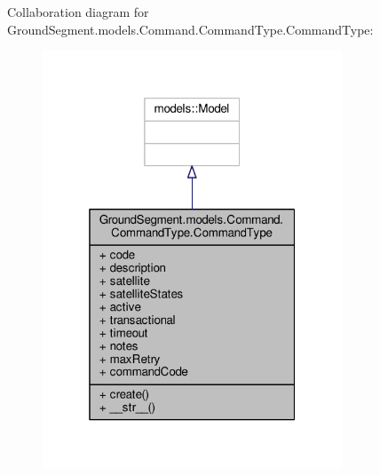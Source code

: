 Collaboration diagram for Ground\+Segment.\+models.\+Command.\+Command\+Type.\+Command\+Type\+:\nopagebreak
\begin{figure}[H]
\begin{center}
\leavevmode
\includegraphics[width=253pt]{class_ground_segment_1_1models_1_1_command_1_1_command_type_1_1_command_type__coll__graph}
\end{center}
\end{figure}
